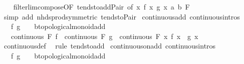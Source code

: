 \begin{isabellebody}
\ \ %
\endisadelimproof
%
\isatagproof
{}\isamarkupfalse%
\ filterlim{\isacharunderscore}{\kern0pt}compose{\isacharbrackleft}{\kern0pt}OF\ tendsto{\isacharunderscore}{\kern0pt}add{\isacharunderscore}{\kern0pt}Pair{\isacharcomma}{\kern0pt}\ of\ {\isachardoublequoteopen}{\isasymlambda}x{\isachardot}{\kern0pt}\ {\isacharparenleft}{\kern0pt}f\ x{\isacharcomma}{\kern0pt}\ g\ x{\isacharparenright}{\kern0pt}{\isachardoublequoteclose}\ a\ b\ F{\isacharbrackright}{\kern0pt}\isanewline
\ \ \isamarkupfalse%
\ {\isacharparenleft}{\kern0pt}simp\ add{\isacharcolon}{\kern0pt}\ nhds{\isacharunderscore}{\kern0pt}prod{\isacharbrackleft}{\kern0pt}symmetric{\isacharbrackright}{\kern0pt}\ tendsto{\isacharunderscore}{\kern0pt}Pair{\isacharparenright}{\kern0pt}%
\endisatagproof
{\isafoldproof}%
%
\isadelimproof
\isanewline
%
\endisadelimproof
\isanewline
{}\isamarkupfalse%
\ continuous{\isacharunderscore}{\kern0pt}add\ {\isacharbrackleft}{\kern0pt}continuous{\isacharunderscore}{\kern0pt}intros{\isacharbrackright}{\kern0pt}{\isacharcolon}{\kern0pt}\isanewline
\ \ \ f\ g\ {\isacharcolon}{\kern0pt}{\isacharcolon}{\kern0pt}\ {\isachardoublequoteopen}{\isacharunderscore}{\kern0pt}\ {\isasymRightarrow}\ {\isacharprime}{\kern0pt}b{\isacharcolon}{\kern0pt}{\isacharcolon}{\kern0pt}topological{\isacharunderscore}{\kern0pt}monoid{\isacharunderscore}{\kern0pt}add{\isachardoublequoteclose}\isanewline
\ \ \ {\isachardoublequoteopen}continuous\ F\ f\ {\isasymLongrightarrow}\ continuous\ F\ g\ {\isasymLongrightarrow}\ continuous\ F\ {\isacharparenleft}{\kern0pt}{\isasymlambda}x{\isachardot}{\kern0pt}\ f\ x\ {\isacharplus}{\kern0pt}\ g\ x{\isacharparenright}{\kern0pt}{\isachardoublequoteclose}\isanewline
%
\isadelimproof
\ \ %
\endisadelimproof
%
\isatagproof
{}\isamarkupfalse%
\ continuous{\isacharunderscore}{\kern0pt}def\ \isamarkupfalse%
\ {\isacharparenleft}{\kern0pt}rule\ tendsto{\isacharunderscore}{\kern0pt}add{\isacharparenright}{\kern0pt}%
\endisatagproof
{\isafoldproof}%
%
\isadelimproof
\isanewline
%
\endisadelimproof
\isanewline
{}\isamarkupfalse%
\ continuous{\isacharunderscore}{\kern0pt}on{\isacharunderscore}{\kern0pt}add\ {\isacharbrackleft}{\kern0pt}continuous{\isacharunderscore}{\kern0pt}intros{\isacharbrackright}{\kern0pt}{\isacharcolon}{\kern0pt}\isanewline
\ \ \ f\ g\ {\isacharcolon}{\kern0pt}{\isacharcolon}{\kern0pt}\ {\isachardoublequoteopen}{\isacharunderscore}{\kern0pt}\ {\isasymRightarrow}\ {\isacharprime}{\kern0pt}b{\isacharcolon}{\kern0pt}{\isacharcolon}{\kern0pt}topological{\isacharunderscore}{\kern0pt}monoid{\isacharunderscore}{\kern0pt}add{\isachardoublequoteclose}\isanewline

\end{isabellebody}

